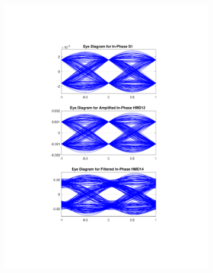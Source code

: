 \begin{figure}[H]
	\centering
	\begin{subfigure}{.45\textwidth}
		\centering
		\includegraphics[clip, trim=5cm 4cm 5cm 4cm,
			width=\textwidth]{./sdf/m_qam_system/figures/eyes/if_nn_p_60_03_rc.pdf}
	\end{subfigure}
	\begin{subfigure}{.45\textwidth}
		\centering

\end{subfigure}
\end{figure}
